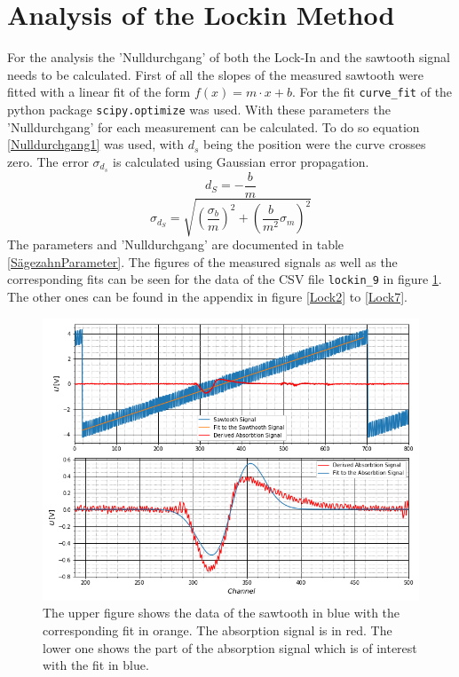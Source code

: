 \section{Analysis of the Lockin Method}
For the analysis the 'Nulldurchgang' of both the Lock-In and the sawtooth signal needs to be calculated. First of all the slopes of the measured sawtooth were fitted with a linear fit of the form $f(x)=m\cdot x+b$. For the fit \verb|curve_fit| of the python package \verb|scipy.optimize| \cite{SciPy_Opti} was used. With these parameters the 'Nulldurchgang' for each measurement can be calculated. To do so equation \ref{Nulldurchgang1} was used, with $d_s$ being the position were the curve crosses zero. The error $\sigma_{d_s}$ is calculated using Gaussian error propagation.
\begin{equation}
	d_S=-\frac{b}{m}
	\label{Nulldurchgang1}
\end{equation}
\begin{equation}
	\sigma_{d_S}=\sqrt{(\frac{\sigma_{b}}{m})^2+(\frac{b}{m^2}\sigma_{m})^2}
\end{equation}
The parameters and 'Nulldurchgang' are documented in table \ref{SägezahnParameter}. The figures of the measured signals as well as the corresponding fits can be seen for the data of the CSV file \verb|lockin_9| in figure \ref{Example}. The other ones can be found in the appendix in figure \ref{Lock2} to \ref{Lock7}.\par
\begin{figure}[ht]
	\includegraphics[scale=0.5]{Bild/LockIn8.png}
	\centering
	\caption[Plots and Fits of Lock-In Method 1]{\small The upper figure shows the data of the sawtooth in blue with the corresponding fit in orange. The absorption signal is in red. The lower one shows the part of the absorption signal which is of interest with the fit in blue.}
	\label{Example}
\end{figure}
